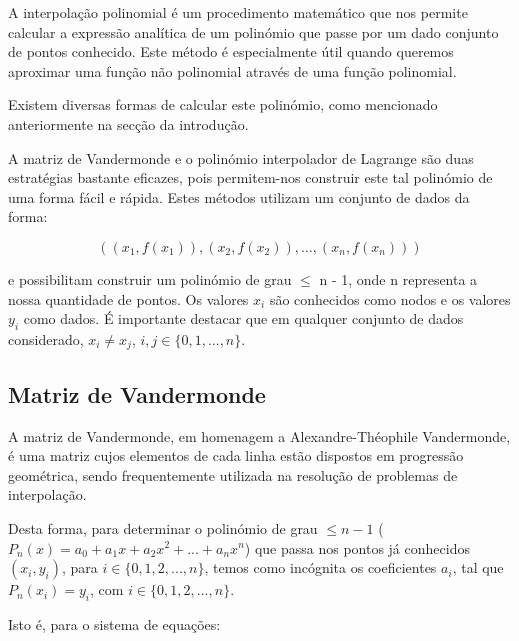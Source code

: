 \documentclass[12pt]{article}
\begin{document}
 \hspace{0.5cm}A interpolação polinomial é um procedimento matemático que nos permite calcular a expressão analítica de um polinómio que passe por um dado conjunto de pontos conhecido. Este método é especialmente útil quando queremos aproximar uma função não polinomial através de uma função polinomial.
 
 \hspace{0.5cm}Existem diversas formas de calcular este polinómio, como mencionado anteriormente na secção da introdução.
 
 \hspace{0.5cm}A matriz de Vandermonde e o polinómio interpolador de Lagrange são duas estratégias bastante eficazes, pois permitem-nos construir este tal polinómio de uma forma fácil e rápida. Estes métodos utilizam um conjunto de dados da forma:

\[
((x_1, f(x_1)), (x_2, f(x_2)), \dots, (x_n, f(x_n)))
\]

e possibilitam construir um polinómio de grau $\leq$ n - 1, onde n representa a nossa quantidade de pontos. Os valores $x_i$ são conhecidos como nodos e os valores $y_i$ como dados. É importante destacar que em qualquer conjunto de dados considerado, $x_i \neq x_j$, $i, j \in \{0, 1, ..., n \}$.


   

\subsection{Matriz de Vandermonde}
   
\hspace{0.5cm}A matriz de Vandermonde, em homenagem a Alexandre-Théophile Vandermonde, é uma matriz cujos elementos de cada linha estão dispostos em progressão geométrica, sendo frequentemente utilizada na resolução de problemas de interpolação.
   
\hspace{0.5cm}Desta forma, para determinar o polinómio de grau $\leq n - 1$ ($P_n(x) = a_0 + a_1x + a_2x^2 + ... + a_nx^n$) que passa nos pontos já conhecidos $(x_i, y_i)$, para $i \in \{0,1,2,...,n\}$, temos como incógnita os coeficientes $a_i$, tal que  $P_n(x_i) = y_i$, com $i \in \{0,1,2,...,n\}$.

    Isto é, para o sistema de equações:
   
\end{document}
